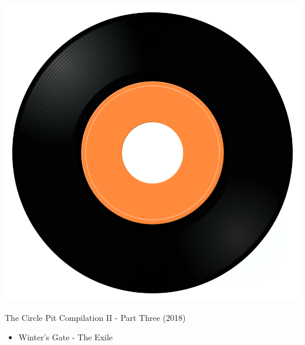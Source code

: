\begin{minipage}[t]{0.25\textwidth}\vspace{0pt}
\captionsetup{type=figure}
\includegraphics[width=\textwidth]{Images/cover.png}
\caption*{The Circle Pit Compilation II - Part Three (2018)}
\end{minipage}
\begin{minipage}[t]{0.25\textwidth}\vspace{0pt}
\begin{itemize}[nosep,leftmargin=1em,labelwidth=*,align=left]
	\setlength{\itemsep}{0pt}
	\item Winter's Gate - The Exile
\end{itemize}
\end{minipage}
